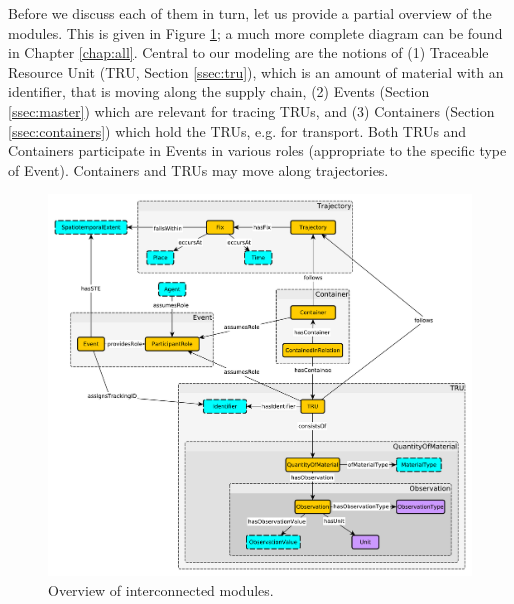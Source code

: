 Before we discuss each of them in turn, let us provide a partial overview of the modules. This is given in Figure \ref{fig:agri_overview}; a much more complete diagram can be found in Chapter \ref{chap:all}. Central to our  modeling are the notions of (1) Traceable Resource Unit (TRU, Section \ref{ssec:tru}), which is an amount of material with an identifier, that is moving along the supply chain, (2) Events (Section \ref{ssec:master}) which are relevant for  tracing TRUs, and (3) Containers (Section \ref{ssec:containers}) which hold the TRUs, e.g. for transport. Both TRUs and Containers participate in Events in various roles (appropriate to the specific type of Event). Containers and TRUs may move along trajectories. 

\begin{figure}[ptb]
\begin{center}
\includegraphics[width=\textwidth]{diagrams/agri_overview}
\end{center}
\caption{Overview of interconnected modules.}
\label{fig:agri_overview}
\end{figure}

\newpage

